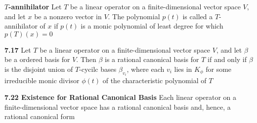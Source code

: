 \documentclass[11pt]{article}
\begin{document}
\begin{defn*}
    \textbf{$T$-annihilator} Let $T$ be a linear operator on a finite-dimensional vector space $V$, and let $x$ be a nonzero vector in $V$. The polynomial $p(t)$ is called a $T$-annihilator of $x$ if $p(t)$ is a monic polynomial of least degree for which $p(T)(x)=0$
\end{defn*}


\begin{theorem*}
    \textbf{7.17} Let $T$ be a linear operator on a finite-dimensional vector space $V$, and let $\beta$ be a ordered basis for $V$. Then $\beta$ is a rational canonical basis for $T$ if and only if $\beta$ is the disjoint union of $T$-cycilc bases $\beta_{v_i}$, where each $v_i$ lies in $K_{\phi}$ for some irreducible monic divisor $\phi(t)$ of the characteristic polynomial of $T$
\end{theorem*}


\begin{theorem*}
    \textbf{7.22 Existence for Rational Canonical Basis} Each linear operator on a finite-dimensional vector space has a rational canonical basis and, hence, a rational canonical form
\end{theorem*}
\end{document}
